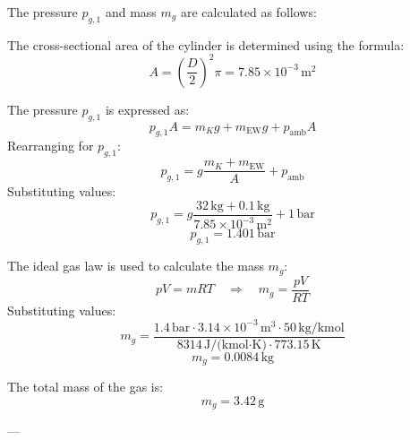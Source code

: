 The pressure \( p_{g,1} \) and mass \( m_g \) are calculated as follows:  

The cross-sectional area of the cylinder is determined using the formula:  
\[
A = \left(\frac{D}{2}\right)^2 \pi = 7.85 \times 10^{-3} \, \text{m}^2
\]  

The pressure \( p_{g,1} \) is expressed as:  
\[
p_{g,1} A = m_K g + m_{\text{EW}} g + p_{\text{amb}} A
\]  
Rearranging for \( p_{g,1} \):  
\[
p_{g,1} = g \frac{m_K + m_{\text{EW}}}{A} + p_{\text{amb}}
\]  
Substituting values:  
\[
p_{g,1} = g \frac{32 \, \text{kg} + 0.1 \, \text{kg}}{7.85 \times 10^{-3} \, \text{m}^2} + 1 \, \text{bar}
\]  
\[
p_{g,1} = 1.401 \, \text{bar}
\]  

The ideal gas law is used to calculate the mass \( m_g \):  
\[
p V = m R T \quad \Rightarrow \quad m_g = \frac{p V}{R T}
\]  
Substituting values:  
\[
m_g = \frac{1.4 \, \text{bar} \cdot 3.14 \times 10^{-3} \, \text{m}^3 \cdot 50 \, \text{kg/kmol}}{8314 \, \text{J/(kmol·K)} \cdot 773.15 \, \text{K}}
\]  
\[
m_g = 0.0084 \, \text{kg}
\]  

The total mass of the gas is:  
\[
m_g = 3.42 \, \text{g}
\]  

---